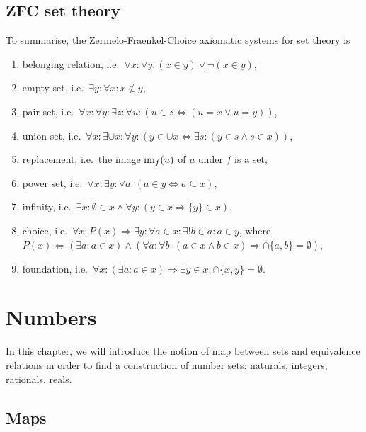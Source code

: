 \section{ZFC set theory}

    To summarise, the Zermelo-Fraenkel-Choice axiomatic systems for set theory is
    \begin{enumerate}
        \item belonging relation, i.e.~$\forall x \colon \forall y \colon (x \in y) \veebar \lnot (x \in y)$,
        \item empty set, i.e.~$\exists y \colon \forall x \colon x \notin y$,
        \item pair set, i.e.~$\forall x \colon \forall y \colon \exists z \colon \forall u \colon (u \in z \Leftrightarrow (u = x \lor u = y))$,
        \item union set, i.e.~$\forall x \colon \exists \cup x \colon \forall y \colon (y \in \cup x \Leftrightarrow \exists s \colon (y \in s \land s \in x))$,
        \item replacement, i.e.~the image $\operatorname{im}_f (u)$ of $u$ under $f$ is a set,
        \item power set, i.e.~$\forall x \colon \exists y \colon \forall a \colon (a \in y \Leftrightarrow a \subseteq x)$,
        \item infinity, i.e.~$\exists x \colon \emptyset \in x \land \forall y \colon (y \in x \Rightarrow \{y\} \in x)$,
        \item choice, i.e.~$\forall x \colon P(x) \Rightarrow \exists y \colon \forall a \in x \colon \exists ! b \in a \colon a \in y$, where $P(x) \Leftrightarrow (\exists a \colon a \in x ) \land (\forall a \colon \forall b \colon (a \in x \land b \in x) \Rightarrow \cap \{a,b\} = \emptyset)$,
        \item foundation, i.e.~$\forall x \colon (\exists a \colon a \in x) \Rightarrow \exists y \in x \colon \cap \{x, y\} = \emptyset$.
    \end{enumerate}

\chapter{Numbers}

    In this chapter, we will introduce the notion of map between sets and equivalence relations in order to find a construction of number sets: naturals, integers, rationals, reals.

\section{Maps}

